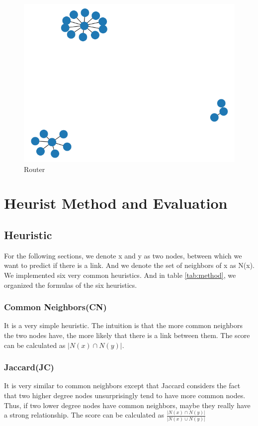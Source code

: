 \documentclass[12pt]{article}
\begin{document}
\begin{figure}[h]
	\centering
	\includegraphics[scale=0.3]{Router}
	\caption{Router}
	\label{fig:Router}
\end{figure}
\section{Heurist Method and Evaluation}

\subsection{Heuristic}
For the following sections, we denote x and y as two nodes, between which we want to predict if there is a link. And we denote the set of neighbors of x as N(x). We implemented six very common heuristics. And in table \ref{tab:method}, we organized the formulas of the six heuristics. \\
\subsubsection{Common Neighbors(CN)}
It is a very simple heuristic. The intuition is that the more common neighbors the two nodes have, the more likely that there is a link between them. The score can be calculated as $|N(x) \cap N(y)|$.
\subsubsection{Jaccard(JC)}
It is very similar to common neighbors except that Jaccard considers the fact that two higher degree nodes unsurprisingly tend to have more common nodes. Thus, if two lower degree nodes have common neighbors, maybe they really have a strong relationship. The score can be calculated as $\frac{|N(x) \cap N(y)|}{|N(x) \cup N(y)|}$
\end{document}
